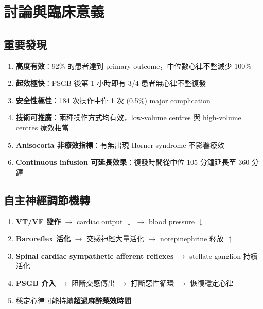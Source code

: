 \documentclass[12pt,a4paper]{article}
\begin{document}
\section{討論與臨床意義}

\subsection{重要發現}

\begin{enumerate}
    \item \textcolor{emergency_blue}{\textbf{高度有效}}：92\% 的患者達到 primary outcome，中位數心律不整減少 100\%
    \item \textcolor{emergency_blue}{\textbf{起效極快}}：PSGB 後第 1 小時即有 3/4 患者無心律不整復發
    \item \textcolor{emergency_blue}{\textbf{安全性極佳}}：184 次操作中僅 1 次 (0.5\%) major complication
    \item \textcolor{emergency_blue}{\textbf{技術可推廣}}：兩種操作方式均有效，low-volume centres 與 high-volume centres 療效相當
    \item \textcolor{emergency_blue}{\textbf{Anisocoria 非療效指標}}：有無出現 Horner syndrome 不影響療效
    \item \textcolor{emergency_blue}{\textbf{Continuous infusion 可延長效果}}：復發時間從中位 105 分鐘延長至 360 分鐘
\end{enumerate}

\subsection{自主神經調節機轉}

\begin{tcolorbox}[
    colback=emergency_red!5!white,
    colframe=emergency_red,
    title=\textbf{PSGB 阻斷惡性循環的機轉},
    fonttitle=\bfseries
]
\begin{enumerate}
    \item \textbf{VT/VF 發作} $\rightarrow$ cardiac output $\downarrow$ $\rightarrow$ blood pressure $\downarrow$
    \item \textbf{Baroreflex 活化} $\rightarrow$ 交感神經大量活化 $\rightarrow$ norepinephrine 釋放 $\uparrow$
    \item \textbf{Spinal cardiac sympathetic afferent reflexes} $\rightarrow$ stellate ganglion 持續活化
    \item \textbf{PSGB 介入} $\rightarrow$ 阻斷交感傳出 $\rightarrow$ 打斷惡性循環 $\rightarrow$ 恢復穩定心律
    \item 穩定心律可能持續\textbf{超過麻醉藥效時間}
\end{enumerate}
\end{tcolorbox}
\end{document}
